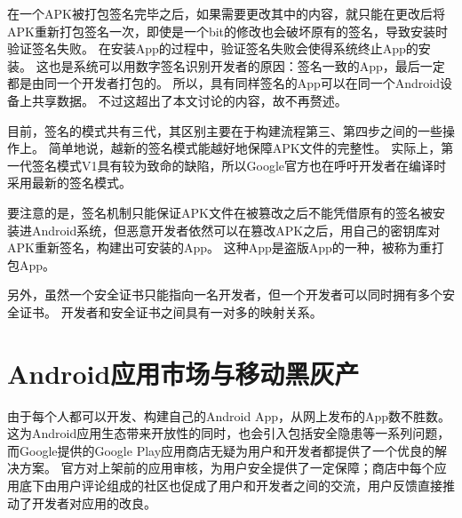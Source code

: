 %

在一个APK被打包签名完毕之后，如果需要更改其中的内容，就只能在更改后将APK重新打包签名一次，即使是一个bit的修改也会破坏原有的签名，导致安装时验证签名失败。
在安装App的过程中，验证签名失败会使得系统终止App的安装。
这也是系统可以用数字签名识别开发者的原因：签名一致的App，最后一定都是由同一个开发者打包的。
所以，具有同样签名的App可以在同一个Android设备上共享数据。
不过这超出了本文讨论的内容，故不再赘述。

目前，签名的模式共有三代，其区别主要在于构建流程第三、第四步之间的一些操作上。
简单地说，越新的签名模式能越好地保障APK文件的完整性。
实际上，第一代签名模式V1具有较为致命的缺陷，所以Google官方也在呼吁开发者在编译时采用最新的签名模式。

要注意的是，签名机制只能保证APK文件在被篡改之后不能凭借原有的签名被安装进Android系统，但恶意开发者依然可以在篡改APK之后，用自己的密钥库对APK重新签名，构建出可安装的App。
这种App是盗版App的一种，被称为重打包App。

另外，虽然一个安全证书只能指向一名开发者，但一个开发者可以同时拥有多个安全证书。
开发者和安全证书之间具有一对多的映射关系。

\section{Android应用市场与移动黑灰产}
\label{sec:androidMkt}

由于每个人都可以开发、构建自己的Android App，从网上发布的App数不胜数。
这为Android应用生态带来开放性的同时，也会引入包括安全隐患等一系列问题，而Google提供的Google Play应用商店无疑为用户和开发者都提供了一个优良的解决方案。
官方对上架前的应用审核，为用户安全提供了一定保障；商店中每个应用底下由用户评论组成的社区也促成了用户和开发者之间的交流，用户反馈直接推动了开发者对应用的改良。

